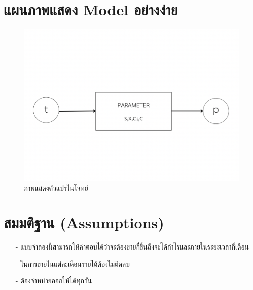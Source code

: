 \documentclass{report}
\begin{document}
\section{แผนภาพแสดง Model อย่างง่าย}
\begin{figure}[!ht]
	\centering
	\includegraphics[scale=0.3]{KR.png}
	\caption{ภาพแสดงตัวแปรในโจทย์}
	\label{fig : graph2}
\end{figure}

\section{สมมติฐาน (Assumptions)} 
\begin{itemize}
	\item[-] แบบจําลองนี้สามารถให้คําตอบได้ว่าจะต้องขายกี่ชิ้นถึงจะได้กําไรและภายในระยะเวลากี่เดือน
	\item[-] ในการขายในแต่ละเดือนรายได้ต้องไม่ติดลบ
	\item[-] ต้องจำหน่ายออกให้ได้ทุกวัน
\end{itemize}
\end{document}
